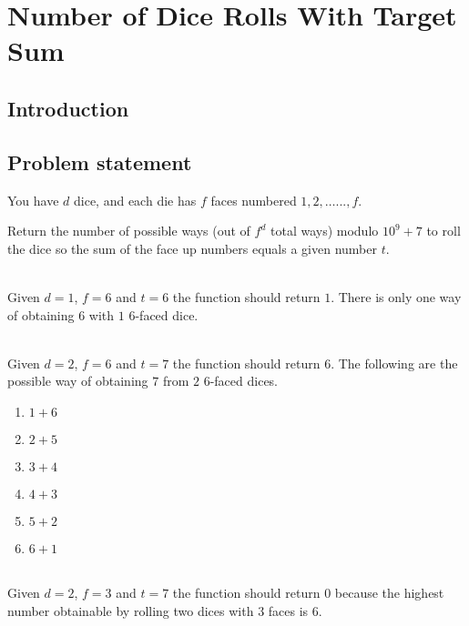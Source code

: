 %

\chapter{Number of Dice Rolls With Target Sum}
\label{ch:dice_rolls}
\section*{Introduction}

\section{Problem statement}
\begin{exercise}
You have $d$ dice, and each die has $f$ faces numbered $1, 2, \ldots..., f$.

Return the number of possible ways (out of $f^d$ total ways) modulo $10^9 + 7$ to roll the dice so the sum of the face up numbers equals a given number $t$.

	\begin{example}
		\hfill \\
		Given $d=1$, $f=6$ and $t=6$ the function should return $1$. There is only one way of obtaining $6$ with $1$ $6$-faced dice.
	\end{example}

	\begin{example}
		\hfill \\
		Given $d=2$, $f=6$ and $t=7$ the function should return $6$. The following are the possible way of obtaining $7$ from $2$ $6$-faced dices.
		\begin{enumerate}
			\item $1+6$
			\item $2+5$
			\item $3+4$
			\item $4+3$
			\item $5+2$
			\item $6+1$
		\end{enumerate}
		
	\end{example}

	\begin{example}
		\hfill \\
		Given $d=2$, $f=3$ and $t=7$ the function should return $0$ because the highest number obtainable by rolling two dices with $3$ faces is $6$.
	\end{example}
\end{exercise}

